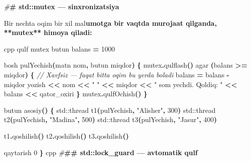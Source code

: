 \documentclass[a4paper,11pt,twoside,openright]{book}
\newenvironment{Shaded}{\begin{snugshade}}{\end{snugshade}}
\newcommand{\BuiltInTok}[1]{#1}
\newcommand{\CharTok}[1]{\textcolor[rgb]{0.31,0.60,0.02}{#1}}
\newcommand{\CommentTok}[1]{\textcolor[rgb]{0.56,0.35,0.01}{\textit{#1}}}
\newcommand{\DecValTok}[1]{\textcolor[rgb]{0.00,0.00,0.81}{#1}}
\newcommand{\ErrorTok}[1]{\textcolor[rgb]{0.64,0.00,0.00}{\textbf{#1}}}
\newcommand{\NormalTok}[1]{#1}
\newcommand{\OperatorTok}[1]{\textcolor[rgb]{0.81,0.36,0.00}{\textbf{#1}}}
\newcommand{\PreprocessorTok}[1]{\textcolor[rgb]{0.56,0.35,0.01}{\textit{#1}}}
\newcommand{\StringTok}[1]{\textcolor[rgb]{0.31,0.60,0.02}{#1}}
\begin{document}
\begin{Shaded}
\begin{Highlighting}[]
\PreprocessorTok{\#}\ErrorTok{\# \textasciigrave{}std::mutex\textasciigrave{} — sinxronizatsiya}

\NormalTok{Bir nechta oqim bir xil ma}\CharTok{\textquotesingle{}l}\ErrorTok{umotga bir vaqtda murojaat qilganda, **mutex** himoya qiladi:}

\ErrorTok{\textasciigrave{}\textasciigrave{}\textasciigrave{}}\NormalTok{cpp}
\NormalTok{qulf mutex}
\NormalTok{butun balans }\OperatorTok{=} \DecValTok{1000}

\NormalTok{bosh pulYechish}\OperatorTok{(}\NormalTok{matn nom}\OperatorTok{,}\NormalTok{ butun miqdor}\OperatorTok{)} \OperatorTok{\{}
\NormalTok{    mutex}\OperatorTok{.}\NormalTok{qulflash}\OperatorTok{()}
\NormalTok{    agar }\OperatorTok{(}\NormalTok{balans }\OperatorTok{\textgreater{}=}\NormalTok{ miqdor}\OperatorTok{)} \OperatorTok{\{}
        \CommentTok{// Xavfsiz — faqat bitta oqim bu yerda bo\textquotesingle{}ladi}
\NormalTok{        balans }\OperatorTok{=}\NormalTok{ balans }\OperatorTok{{-}}\NormalTok{ miqdor}
\NormalTok{        yozish }\OperatorTok{\textless{}\textless{}}\NormalTok{ nom }\OperatorTok{\textless{}\textless{}} \StringTok{" "} \OperatorTok{\textless{}\textless{}}\NormalTok{ miqdor }\OperatorTok{\textless{}\textless{}} \StringTok{" so\textquotesingle{}m yechdi. Qoldiq: "} \OperatorTok{\textless{}\textless{}}\NormalTok{ balans }\OperatorTok{\textless{}\textless{}}\NormalTok{ qator\_oxiri}
    \OperatorTok{\}}
\NormalTok{    mutex}\OperatorTok{.}\NormalTok{qulfOchish}\OperatorTok{()}
\OperatorTok{\}}

\NormalTok{butun asosiy}\OperatorTok{()} \OperatorTok{\{}
    \BuiltInTok{std::}\NormalTok{thread t1}\OperatorTok{(}\NormalTok{pulYechish}\OperatorTok{,} \StringTok{"Alisher"}\OperatorTok{,} \DecValTok{300}\OperatorTok{)}
    \BuiltInTok{std::}\NormalTok{thread t2}\OperatorTok{(}\NormalTok{pulYechish}\OperatorTok{,} \StringTok{"Madina"}\OperatorTok{,} \DecValTok{500}\OperatorTok{)}
    \BuiltInTok{std::}\NormalTok{thread t3}\OperatorTok{(}\NormalTok{pulYechish}\OperatorTok{,} \StringTok{"Jasur"}\OperatorTok{,} \DecValTok{400}\OperatorTok{)}

\NormalTok{    t1}\OperatorTok{.}\NormalTok{qoshilish}\OperatorTok{()}
\NormalTok{    t2}\OperatorTok{.}\NormalTok{qoshilish}\OperatorTok{()}
\NormalTok{    t3}\OperatorTok{.}\NormalTok{qoshilish}\OperatorTok{()}

\NormalTok{    qaytarish }\DecValTok{0}
\OperatorTok{\}}
\ErrorTok{\textasciigrave{}\textasciigrave{}\textasciigrave{}}\NormalTok{cpp}
\PreprocessorTok{\#}\ErrorTok{\#\# \textasciigrave{}std::lock\_guard\textasciigrave{} — avtomatik qulf}


\end{Highlighting}
\end{Shaded}
\end{document}
